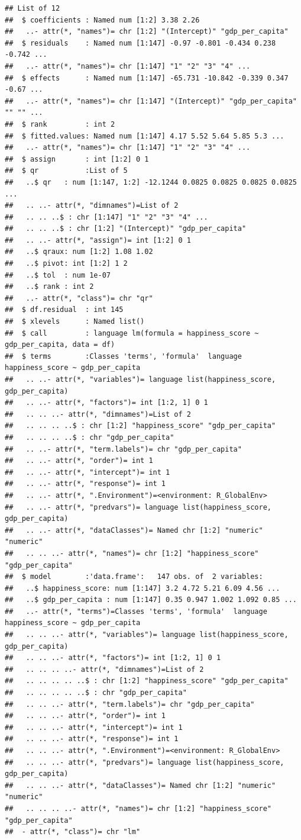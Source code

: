 \documentclass[]{article}
\begin{document}
\begin{verbatim}
## List of 12
##  $ coefficients : Named num [1:2] 3.38 2.26
##   ..- attr(*, "names")= chr [1:2] "(Intercept)" "gdp_per_capita"
##  $ residuals    : Named num [1:147] -0.97 -0.801 -0.434 0.238 -0.742 ...
##   ..- attr(*, "names")= chr [1:147] "1" "2" "3" "4" ...
##  $ effects      : Named num [1:147] -65.731 -10.842 -0.339 0.347 -0.67 ...
##   ..- attr(*, "names")= chr [1:147] "(Intercept)" "gdp_per_capita" "" "" ...
##  $ rank         : int 2
##  $ fitted.values: Named num [1:147] 4.17 5.52 5.64 5.85 5.3 ...
##   ..- attr(*, "names")= chr [1:147] "1" "2" "3" "4" ...
##  $ assign       : int [1:2] 0 1
##  $ qr           :List of 5
##   ..$ qr   : num [1:147, 1:2] -12.1244 0.0825 0.0825 0.0825 0.0825 ...
##   .. ..- attr(*, "dimnames")=List of 2
##   .. .. ..$ : chr [1:147] "1" "2" "3" "4" ...
##   .. .. ..$ : chr [1:2] "(Intercept)" "gdp_per_capita"
##   .. ..- attr(*, "assign")= int [1:2] 0 1
##   ..$ qraux: num [1:2] 1.08 1.02
##   ..$ pivot: int [1:2] 1 2
##   ..$ tol  : num 1e-07
##   ..$ rank : int 2
##   ..- attr(*, "class")= chr "qr"
##  $ df.residual  : int 145
##  $ xlevels      : Named list()
##  $ call         : language lm(formula = happiness_score ~ gdp_per_capita, data = df)
##  $ terms        :Classes 'terms', 'formula'  language happiness_score ~ gdp_per_capita
##   .. ..- attr(*, "variables")= language list(happiness_score, gdp_per_capita)
##   .. ..- attr(*, "factors")= int [1:2, 1] 0 1
##   .. .. ..- attr(*, "dimnames")=List of 2
##   .. .. .. ..$ : chr [1:2] "happiness_score" "gdp_per_capita"
##   .. .. .. ..$ : chr "gdp_per_capita"
##   .. ..- attr(*, "term.labels")= chr "gdp_per_capita"
##   .. ..- attr(*, "order")= int 1
##   .. ..- attr(*, "intercept")= int 1
##   .. ..- attr(*, "response")= int 1
##   .. ..- attr(*, ".Environment")=<environment: R_GlobalEnv> 
##   .. ..- attr(*, "predvars")= language list(happiness_score, gdp_per_capita)
##   .. ..- attr(*, "dataClasses")= Named chr [1:2] "numeric" "numeric"
##   .. .. ..- attr(*, "names")= chr [1:2] "happiness_score" "gdp_per_capita"
##  $ model        :'data.frame':   147 obs. of  2 variables:
##   ..$ happiness_score: num [1:147] 3.2 4.72 5.21 6.09 4.56 ...
##   ..$ gdp_per_capita : num [1:147] 0.35 0.947 1.002 1.092 0.85 ...
##   ..- attr(*, "terms")=Classes 'terms', 'formula'  language happiness_score ~ gdp_per_capita
##   .. .. ..- attr(*, "variables")= language list(happiness_score, gdp_per_capita)
##   .. .. ..- attr(*, "factors")= int [1:2, 1] 0 1
##   .. .. .. ..- attr(*, "dimnames")=List of 2
##   .. .. .. .. ..$ : chr [1:2] "happiness_score" "gdp_per_capita"
##   .. .. .. .. ..$ : chr "gdp_per_capita"
##   .. .. ..- attr(*, "term.labels")= chr "gdp_per_capita"
##   .. .. ..- attr(*, "order")= int 1
##   .. .. ..- attr(*, "intercept")= int 1
##   .. .. ..- attr(*, "response")= int 1
##   .. .. ..- attr(*, ".Environment")=<environment: R_GlobalEnv> 
##   .. .. ..- attr(*, "predvars")= language list(happiness_score, gdp_per_capita)
##   .. .. ..- attr(*, "dataClasses")= Named chr [1:2] "numeric" "numeric"
##   .. .. .. ..- attr(*, "names")= chr [1:2] "happiness_score" "gdp_per_capita"
##  - attr(*, "class")= chr "lm"
\end{verbatim}
\end{document}
